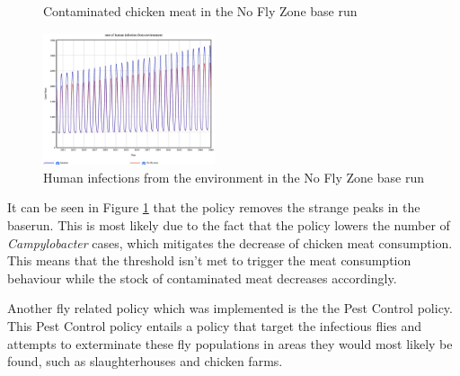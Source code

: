 \begin{figure}[h!]
\begin{minipage}{0.45\textwidth}
        \caption{Contaminated chicken meat in the No Fly Zone base run}
        \label{fig:p2_meat}
    \end{minipage}
\end{figure} 

\begin{figure}[h]
\centering
\includegraphics[width=0.45\textwidth]{images/p2_humanenvo.jpeg}
\caption{Human infections from the environment in the No Fly Zone base run }
\label{fig:p2_humanenvo}
\end{figure}

It can be seen in Figure \ref{fig:p2_meat} that the policy removes the strange peaks in the baserun. This is most likely due to the fact that the policy lowers the number of \textit{Campylobacter} cases, which mitigates the decrease of chicken meat consumption. This means that the threshold isn't met to trigger the meat consumption behaviour while the stock of contaminated meat decreases accordingly. 

Another fly related policy which was implemented is the the Pest Control policy. This Pest Control policy entails a policy that target the infectious flies and attempts to exterminate these fly populations in areas they would most likely be found, such as slaughterhouses and chicken farms.  

